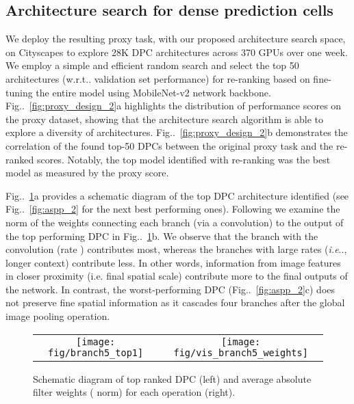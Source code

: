 \documentclass{article}
\makeatletter
\def\@onedot{\ifx\@let@token.\else.\null\fi\xspace}
\DeclareRobustCommand\onedot{\futurelet\@let@token\@onedot}
\newcommand{\figref}[1]{Fig\onedot~\ref{#1}}
\def\ie{\emph{i.e}\onedot} \def\Ie{\emph{I.e}\onedot}
\def\wrt{w.r.t\onedot} \def\dof{d.o.f\onedot}
\makeatother
\begin{document}
\subsection{Architecture search for dense prediction cells}

We deploy the resulting proxy task, with our proposed architecture search space, on Cityscapes to explore 28K DPC architectures across 370 GPUs over one week. We employ a simple and efficient random search \cite{bergstra2012random, golovin2017google} and select the top 50 architectures (\wrt validation set performance) for re-ranking based on fine-tuning the entire model using MobileNet-v2 network backbone. \figref{fig:proxy_design_2}a highlights the distribution of performance scores on the proxy dataset, showing that the architecture search algorithm is able to explore a diversity of architectures. \figref{fig:proxy_design_2}b demonstrates the correlation of the found top-50 DPCs between the original proxy task and the re-ranked scores. Notably, the top model identified with re-ranking was the  best model as measured by the proxy score.






\figref{fig:aspp}a provides a schematic diagram of the top DPC architecture identified (see \figref{fig:aspp_2} for the next best performing ones). Following \cite{huang2017densely} we examine the  norm of the weights connecting each branch (via a  convolution) to the output of the top performing DPC in \figref{fig:aspp}b. We observe that the branch with the  convolution (rate ) contributes most, whereas the branches with large rates (\ie, longer context) contribute less. In other words, information from image features in closer proximity (i.e. final spatial scale) contribute more to the final outputs of the network. In contrast, the worst-performing DPC (\figref{fig:aspp_2}c) does not preserve fine spatial information as it cascades four branches after the global image pooling operation.




\begin{figure}[!t]
  \centering
  \begin{tabular}{c c}
    \texttt{[image: fig/branch5\_top1]} &
    \texttt{[image: fig/vis\_branch5\_weights]} \\
\end{tabular}
  \caption{Schematic diagram of top ranked DPC (left) and average absolute filter weights ( norm) for each operation (right).}
  \label{fig:aspp}
\end{figure}
\end{document}
